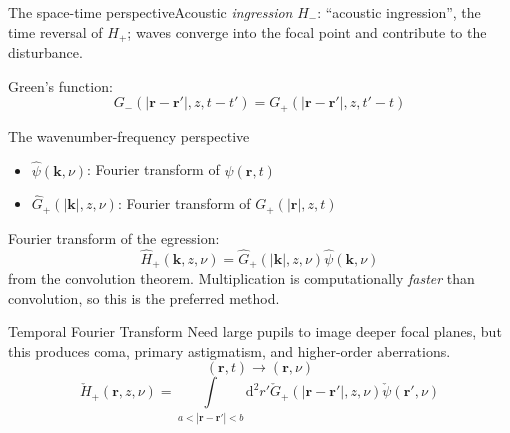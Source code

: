 \documentclass{beamer}
\begin{document}
\begin{frame}{The space-time perspective}{Acoustic \emph{ingression}}
    $H_{-}$: ``acoustic ingression'', the time reversal
    of $H_{+}$; waves converge into the focal point
    and contribute to the disturbance.

    Green's function:
    $$ G_{-}(|\mathbf{r}-\mathbf{r'}|,z,t-t') =
    G_{+}(|\mathbf{r}-\mathbf{r'}|,z,t'-t) $$
\end{frame}

\begin{frame}{The wavenumber-frequency perspective}
    \begin{itemize}
        \item $\hat{\psi}(\mathbf{k},\nu)$: Fourier transform of $\psi(\mathbf{r},t)$
        \item $\hat{G}_{+}(|\mathbf{k}|,z,\nu)$: Fourier transform of
            $G_{+}(|\mathbf{r}|,z,t)$
    \end{itemize}
    Fourier transform of the egression:
    $$ \hat{H}_{+}(\mathbf{k},z,\nu) = \hat{G}_{+}(|\mathbf{k}|,z,\nu)
     \hat{\psi}(\mathbf{k},\nu) $$
    from the convolution theorem.
     Multiplication is computationally \emph{faster} than convolution, so this
     is the preferred method.
\end{frame}
\begin{frame}{Temporal Fourier Transform}
    Need large pupils to image deeper focal planes,
    but this produces coma, primary astigmatism, and higher-order aberrations.
    $$(\mathbf{r},t) \rightarrow (\mathbf{r},\nu)$$
    $$ \check{H}_{+}(\mathbf{r},z,\nu) =
    \int\limits_{a<|\mathbf{r}-\mathbf{r}'|<b}\textrm{d}^{2}r'\check{G}_{+}
        (|\mathbf{r}-\mathbf{r}'|,z,\nu)\check{\psi}(\mathbf{r}',\nu) $$
\end{frame}
\end{document}
